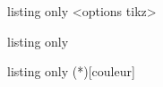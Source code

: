 \begin{PresCodeTexPL}{listing only}
<options tikz>
\pflmachtransf
\end{PresCodeTexPL}

\begin{PresCodeTexPL}{listing only}
\pflclipart
\end{PresCodeTexPL}

\begin{PresCodeTexPL}{listing only}
\pflnocalc(*)[couleur]
\end{PresCodeTexPL}